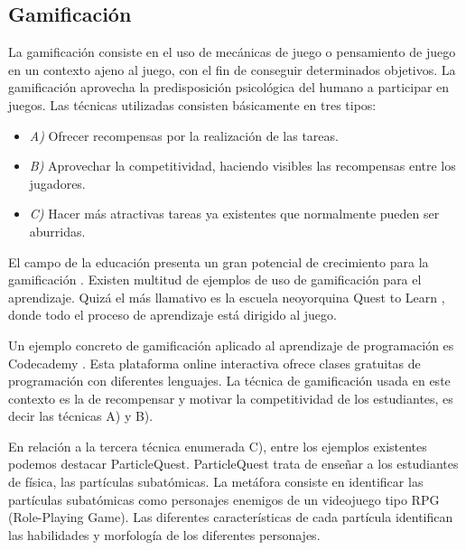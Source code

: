 \documentclass{llncs}
\begin{document}
\subsection{Gamificación}
\label{subsec:gamification}

La gamificación consiste en el uso de mecánicas de juego o pensamiento de juego en un contexto ajeno al juego, con el fin de conseguir determinados objetivos. La gamificación aprovecha la predisposición psicológica del humano a participar en juegos. Las técnicas utilizadas consisten básicamente en tres tipos:
\begin{itemize}
\item {\em A)} Ofrecer recompensas por la realización de las tareas. 
\item {\em B)} Aprovechar la competitividad, haciendo visibles las recompensas entre los jugadores.
\item {\em C)} Hacer más atractivas tareas ya existentes que normalmente pueden ser aburridas. 
\end{itemize}

El campo de la educación presenta un gran potencial de crecimiento para la gamificación \cite{lee2011gamification}. Existen multitud de ejemplos de uso de gamificación para el aprendizaje. Quizá el más llamativo es la escuela neoyorquina Quest to Learn \cite{salen2011quest}, donde todo el proceso de aprendizaje está dirigido al juego. 

Un ejemplo concreto de gamificación aplicado al aprendizaje de programación es Codecademy \cite{codecademy}. Esta plataforma online interactiva ofrece clases gratuitas de programación con diferentes lenguajes. La técnica de gamificación usada en este contexto es la de recompensar y motivar la competitividad de los estudiantes, es decir las técnicas A) y B). 

En relación a la tercera técnica enumerada C), entre los ejemplos existentes podemos destacar ParticleQuest. ParticleQuest trata de enseñar a los estudiantes de física, las partículas subatómicas. La metáfora consiste en identificar las partículas subatómicas como personajes enemigos de un videojuego tipo RPG (Role-Playing Game). Las diferentes características de cada partícula identifican las habilidades y morfología de los diferentes personajes. 
\end{document}

